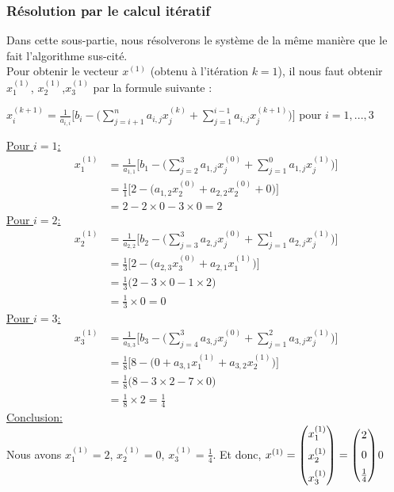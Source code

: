 \documentclass{report}
\begin{document}
\subsubsection{Résolution par le calcul itératif}\label{calcite}
Dans cette sous-partie, nous résolverons le système de la même manière que le fait l'algorithme sus-cité.\\
Pour obtenir le vecteur $x^{(1)}$ (obtenu à l'itération $k=1$), il nous faut obtenir $x_1^{(1)}$, $x_2^{(1)}$,$x_3^{(1)}$ par la formule suivante :\\
\begin{center}
$x_{i}^{(k+1)}=\frac{1}{a_{i,i}}\Bigg[b_i-\Bigg(\sum \limits_{j=i+1}^{n}a_{i,j}x_j^{(k)} + \sum \limits_{j=1}^{i-1}a_{i,j}x_j^{(k+1)}\Bigg)\Bigg]   \text{  pour  } i=1, ..., 3$
\end{center}
\underline{Pour $i=1$:}\\
\begin{align}
  x_{1}^{(1)}&=\frac{1}{a_{1,1}}\Bigg[b_1-\Bigg(\sum \limits_{j=2}^{3}a_{1,j}x_j^{(0)} + \sum \limits_{j=1}^{0}a_{1,j}x_j^{(1)}\Bigg)\Bigg]\\
  &=\frac{1}{1}\Bigg[2-\Bigg(a_{1,2}x_2^{(0)} + a_{2,2}x_2^{(0)}+0\Bigg)\Bigg]\\
  &=2-2\times 0 -3\times 0=2
\end{align}
\underline{Pour $i=2$:}\\
\begin{align}
  x_{2}^{(1)}&=\frac{1}{a_{2,2}}\Bigg[b_2-\Bigg(\sum \limits_{j=3}^{3}a_{2,j}x_j^{(0)} + \sum \limits_{j=1}^{1}a_{2,j}x_j^{(1)}\Bigg)\Bigg]\\
  &=\frac{1}{3}\Bigg[2-\Bigg(a_{2,3}x_3^{(0)} + a_{2,1}x_1^{(1)}\Bigg)\Bigg]\\
  &=\frac{1}{3}\Bigg(2-3\times0-1\times2\Bigg)\\
  &=\frac{1}{3}\times 0=0
\end{align}
\underline{Pour $i=3$:}\\
\begin{align}
  x_{3}^{(1)}&=\frac{1}{a_{3,3}}\Bigg[b_3-\Bigg(\sum \limits_{j=4}^{3}a_{3,j}x_j^{(0)} + \sum \limits_{j=1}^{2}a_{3,j}x_j^{(1)}\Bigg)\Bigg]\\
  &=\frac{1}{8}\Bigg[8-\Bigg(0+a_{3,1}x_1^{(1)} + a_{3,2}x_2^{(1)}\Bigg)\Bigg]\\
  &=\frac{1}{8}\Bigg(8-3\times 2 - 7\times 0\Bigg)\\
  &=\frac{1}{8}\times 2=\frac{1}{4}
\end{align}
\underline{Conclusion:}\\
Nous avons $x_1^{(1)}=2$, $x_2^{(1)}=0$,  $x_3^{(1)}=\frac{1}{4}$.  Et donc, $x^{(1)}=
\begin{pmatrix}
  x_1^{(1)}\vspace{6pt}\\
  x_2^{(1)}\vspace{6pt}\\
  x_3^{(1)}
\end{pmatrix}=
\begin{pmatrix}
  2\vspace{6pt}\\
  0\vspace{6pt}\\
  \frac{1}{4}
\end{pmatrix}$0
\end{document}
